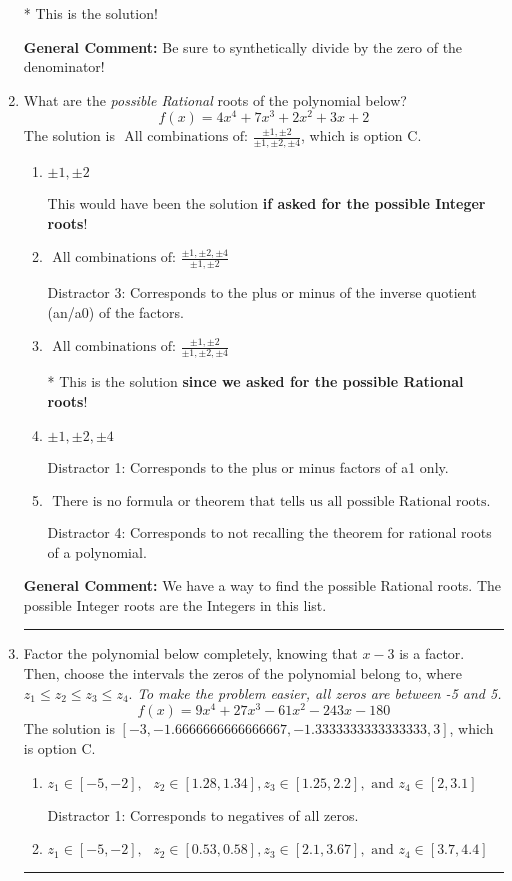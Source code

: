 \documentclass{extbook}[14pt]
\newcommand{\litem}[1]{\item #1

\rule{\textwidth}{0.4pt}}
\begin{document}
\begin{enumerate}
{\begin{enumerate}[label=\Alph*.]
* This is the solution!
\end{enumerate}

\textbf{General Comment:} Be sure to synthetically divide by the zero of the denominator!
}
\litem{
What are the \textit{possible Rational} roots of the polynomial below?
\[ f(x) = 4x^{4} +7 x^{3} +2 x^{2} +3 x + 2 \]The solution is \( \text{ All combinations of: }\frac{\pm 1,\pm 2}{\pm 1,\pm 2,\pm 4} \), which is option C.\begin{enumerate}[label=\Alph*.]
\item \( \pm 1,\pm 2 \)

This would have been the solution \textbf{if asked for the possible Integer roots}!
\item \( \text{ All combinations of: }\frac{\pm 1,\pm 2,\pm 4}{\pm 1,\pm 2} \)

 Distractor 3: Corresponds to the plus or minus of the inverse quotient (an/a0) of the factors. 
\item \( \text{ All combinations of: }\frac{\pm 1,\pm 2}{\pm 1,\pm 2,\pm 4} \)

* This is the solution \textbf{since we asked for the possible Rational roots}!
\item \( \pm 1,\pm 2,\pm 4 \)

 Distractor 1: Corresponds to the plus or minus factors of a1 only.
\item \( \text{ There is no formula or theorem that tells us all possible Rational roots.} \)

 Distractor 4: Corresponds to not recalling the theorem for rational roots of a polynomial.
\end{enumerate}

\textbf{General Comment:} We have a way to find the possible Rational roots. The possible Integer roots are the Integers in this list.
}
\litem{
Factor the polynomial below completely, knowing that $x-3$ is a factor. Then, choose the intervals the zeros of the polynomial belong to, where $z_1 \leq z_2 \leq z_3 \leq z_4$. \textit{To make the problem easier, all zeros are between -5 and 5.}
\[ f(x) = 9x^{4} +27 x^{3} -61 x^{2} -243 x -180 \]The solution is \( [-3, -1.6666666666666667, -1.3333333333333333, 3] \), which is option C.\begin{enumerate}[label=\Alph*.]
\item \( z_1 \in [-5, -2], \text{   }  z_2 \in [1.28, 1.34], z_3 \in [1.25, 2.2], \text{   and   } z_4 \in [2, 3.1] \)

 Distractor 1: Corresponds to negatives of all zeros.
\item \( z_1 \in [-5, -2], \text{   }  z_2 \in [0.53, 0.58], z_3 \in [2.1, 3.67], \text{   and   } z_4 \in [3.7, 4.4] \)


\end{enumerate}}
\end{enumerate}
\end{document}
